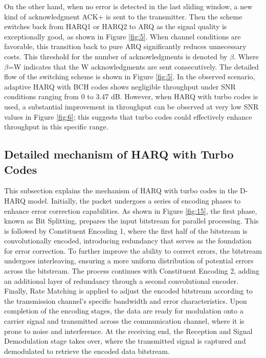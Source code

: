 \documentclass[sn-mathphys-num]{sn-jnl}
\theoremstyle{thmstyleone}
\theoremstyle{thmstyletwo}%
\theoremstyle{thmstylethree}%
\begin{document}
On the other hand, when no error is detected in the last sliding window, a new kind of acknowledgment ACK+ is sent to the transmitter. Then the scheme switches back from HARQ1 or HARQ2 to ARQ as the signal quality is exceptionally good, as shown in Figure \ref{fig:5}. When channel conditions are favorable, this transition back to pure ARQ significantly reduces unnecessary costs. This threshold for the number of acknowledgments is denoted by $\beta$. Where $\beta$=W indicates that the W acknowledgments are sent consecutively. The detailed flow of the switching scheme is shown in Figure \ref{fig:5}. In the observed scenario, adaptive HARQ with BCH codes shows negligible throughput under SNR conditions ranging from 0 to 3.47 dB. However, when HARQ with turbo codes is used, a substantial improvement in throughput can be observed at very low SNR values in Figure \ref{fig:6}; this suggests that turbo codes could effectively enhance throughput in this specific range.

\subsection{Detailed mechanism of HARQ with Turbo Codes} \label{s3.4}

This subsection explains the mechanism of HARQ with turbo codes in the D-HARQ model. Initially, the packet undergoes a series of encoding phases to enhance error correction capabilities. As shown in Figure \ref{fig:15}, the first phase, known as Bit Splitting, prepares the input bitstream for parallel processing. This is followed by Constituent Encoding 1, where the first half of the bitstream is convolutionally encoded, introducing redundancy that serves as the foundation for error correction. To further improve the ability to correct errors, the bitstream undergoes interleaving, ensuring a more uniform distribution of potential errors across the bitstream. The process continues with Constituent Encoding 2, adding an additional layer of redundancy through a second convolutional encoder. Finally, Rate Matching is applied to adjust the encoded bitstream according to the transmission channel's specific bandwidth and error characteristics. Upon completion of the encoding stages, the data are ready for modulation onto a carrier signal and transmitted across the communication channel, where it is prone to noise and interference. At the receiving end, the Reception and Signal Demodulation stage takes over, where the transmitted signal is captured and demodulated to retrieve the encoded data bitstream.
\end{document}
